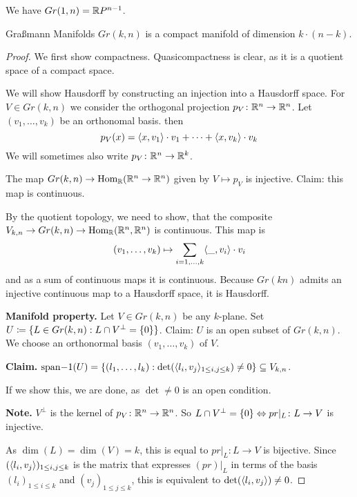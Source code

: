 \documentclass[language=english]{TemplateLecture}
\begin{document}

\begin{example}
    We have \(Gr(1,n) = \mathbb{R} P^{n-1}\).
\end{example}

\begin{thm}{Graßmann Manifolds}{}
    \(Gr(k,n)\) is a compact manifold of dimension \(k \cdot (n-k)\).
\end{thm}

\begin{proof}
    We first show compactness. Quasicompactness is clear, as it is a quotient space of a compact space.

    We will show Hausdorff by constructing an injection into a Hausdorff space. For \(V \in Gr(k,n)\) we consider the orthogonal projection \(p_V\colon \mathbb{R}^n \to \mathbb{R}^n\). Let \((v_1, \dots, v_k)\) be an orthonomal basis. then
    \[p_V(x) = \langle x,v_1\rangle \cdot v_1 + \dots + \langle x, v_k\rangle \cdot v_k\]
    We will sometimes also write \(p_V \colon \mathbb{R}^n \to \mathbb{R}^k\).

    The map \(Gr(k,n) \to \operatorname{Hom}_{\mathbb{R}}(\mathbb{R}^n \to \mathbb{R}^n)\) given by \(V \mapsto p_V\) is injective. Claim: this map is continuous.

    By the quotient topology, we need to show, that the composite \(V_{k,n} \to Gr(k,n) \to \operatorname{Hom}_{\mathbb{R}}(\mathbb{R}^n, \mathbb{R}^n) \) is continuous. This map is
    \[(v_1, \dots, v_k) \mapsto \sum_{i = 1, \dots, k} \langle\_, v_i\rangle \cdot v_i\]
    and as a sum of continuous maps it is continuous.
    Because \(Gr(kn)\) admits an injective continuous map to a Hausdorff space, it is Hausdorff.

    \textbf{Manifold property.} Let \(V \in Gr(k,n)\) be any \(k\)-plane. Set \(U \coloneq \{L \in Gr(k,n) : L \cap V^\perp = \{0\}\}\). Claim: \(U\) is an open subset of \(Gr(k,n)\). We choose an orthonormal basis \((v_1, \dots, v_k)\) of \(V\).

    \textbf{Claim.} \(\mathrm{span}{-1}(U) = \{(l_1, \dots, l_k) : \det(\langle l_i, v_j\rangle_{1 \leq i,j \leq k}) \neq 0\} \subseteq V_{k,n}\).

    If we show this, we are done, as \(\det \neq 0\) is an open condition.

    \textbf{Note.} \(V^\perp\) is the kernel of \(p_V \colon \mathbb{R}^n \to \mathbb{R}^n\). So \(L \cap V^\perp = \{0\} \Leftrightarrow pr\rvert_L \colon L \to V\) is injective.
    
    As \(\dim(L) = \dim(V) = k\), this is equal to \(pr\rvert_L\colon L \to V\) is bijective. Since \((\langle l_i, v_j\rangle)_{1 \leq i,j \leq k}\) is the matrix that expresses \((pr)\rvert_L\) in terms of the basis \((l_i)_{1 \leq i \leq k}\) and \((v_j)_{1 \leq j \leq k}\), this is equivalent to \(\det(\langle l_i, v_j\rangle) \neq 0\).


\end{proof}
\end{document}
